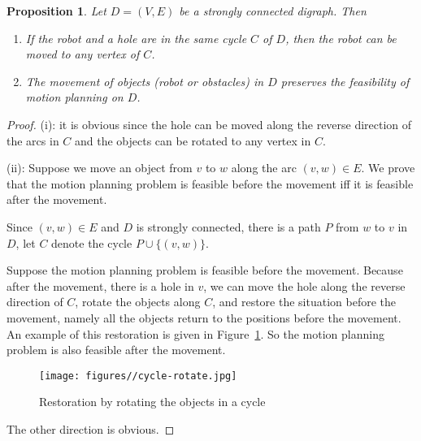 \documentclass{article}
\newtheorem{prop}[thm]{Proposition}
\begin{document}
\begin{prop}\label{prop:motion-strong-observ}
Let $D=(V,E)$ be a strongly connected digraph. Then
\begin{enumerate}
\item If the robot and a hole are in the same cycle $C$ of $D$, then the robot can be moved to any vertex of $C$.

\item The movement of objects (robot or obstacles) in $D$ preserves the feasibility of motion
planning on $D$.
\end{enumerate}
\end{prop}
\begin{proof}

\noindent (i): it is obvious since the hole can be moved along the
reverse direction of the arcs in $C$ and the objects can be rotated
to any vertex in $C$.

\noindent (ii): Suppose we move an object from $v$ to $w$ along the
arc $(v,w) \in E$. We prove that the motion planning problem is
feasible before the movement iff it is feasible after the movement.

Since $(v,w) \in E$ and $D$ is strongly connected, there is a path
$P$ from $w$ to $v$ in $D$, let $C$ denote the cycle $P \cup
\{(v,w)\}$.

Suppose the motion planning problem is feasible before the movement.
Because after the movement, there is a hole in $v$, we can move the
hole along the reverse direction of $C$, rotate the objects along
$C$, and restore the situation before the movement, namely all the
objects return to the positions before the movement. An example of
this restoration is given in Figure~\ref{fig:cycle-rotate}. So the
motion planning problem is also feasible after the movement.

\begin{figure}[ht]
\centering
  \texttt{[image: figures//cycle-rotate.jpg]}
  \caption{Restoration by rotating the objects in a cycle}\label{fig:cycle-rotate}
\end{figure}

The other direction is obvious.
\end{proof}
\end{document}
